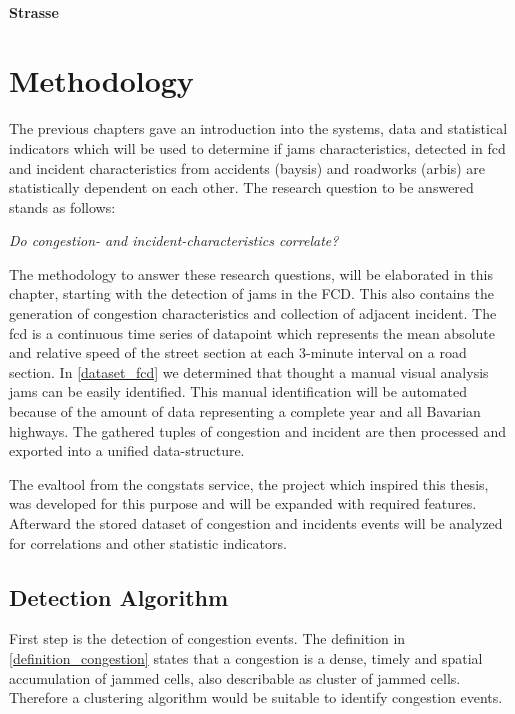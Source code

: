 \documentclass[a4paper,12pt]{report}
\begin{document}
\subsubsection{Strasse}



%

\chapter{Methodology}
\label{methodology}
The previous chapters gave an introduction into the systems, data and statistical indicators which will be used to determine if jams characteristics, detected in \acrshort{fcd} and incident characteristics from accidents (\acrshort{baysis}) and roadworks (\acrshort{arbis}) are statistically dependent on each other. The research question to be answered stands as follows:

\begin{center}
	\textit{Do congestion- and incident-characteristics correlate?}
\end{center}

\medskip

The methodology to answer these research questions, will be elaborated in this chapter, starting with the detection of jams in the FCD. This also contains the generation of congestion characteristics and collection of adjacent incident. The \acrshort{fcd} is a continuous time series of datapoint which represents the mean absolute and relative speed of the street section at each 3-minute interval on a road section. In \ref{dataset_fcd} we determined that thought a manual visual analysis jams can be easily identified. This manual identification will be automated because of the amount of data representing a complete year and all Bavarian highways. The gathered tuples of congestion and incident are then processed and exported into a unified data-structure. 

The \gls{evaltool} from the \gls{congstats} service, the project which inspired this thesis, was developed for this purpose and will be expanded with required features. Afterward the stored dataset of congestion and incidents events will be analyzed for correlations and other statistic indicators.

\bigskip

\section{Detection Algorithm}
First step is the detection of congestion events. The definition in \ref{definition_congestion} states that a congestion is a dense, timely and spatial accumulation of jammed cells, also describable as cluster of jammed cells. Therefore a clustering algorithm would be suitable to identify congestion events.
\end{document}
